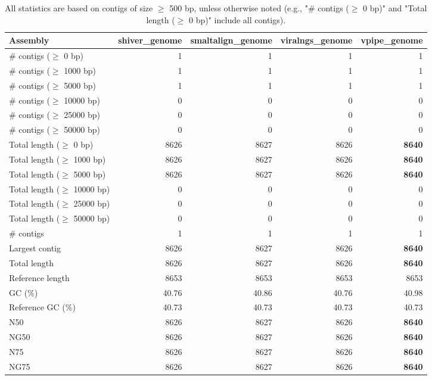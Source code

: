 \documentclass[12pt,a4paper]{article}
\begin{document}
\begin{table}[ht]
\begin{center}
\caption{All statistics are based on contigs of size $\geq$ 500 bp, unless otherwise noted (e.g., "\# contigs ($\geq$ 0 bp)" and "Total length ($\geq$ 0 bp)" include all contigs).}
\begin{tabular}{|l*{4}{|r}|}
\hline
Assembly & shiver\_genome & smaltalign\_genome & viralngs\_genome & vpipe\_genome \\ \hline
\# contigs ($\geq$ 0 bp) & 1 & 1 & 1 & 1 \\ \hline
\# contigs ($\geq$ 1000 bp) & 1 & 1 & 1 & 1 \\ \hline
\# contigs ($\geq$ 5000 bp) & 1 & 1 & 1 & 1 \\ \hline
\# contigs ($\geq$ 10000 bp) & 0 & 0 & 0 & 0 \\ \hline
\# contigs ($\geq$ 25000 bp) & 0 & 0 & 0 & 0 \\ \hline
\# contigs ($\geq$ 50000 bp) & 0 & 0 & 0 & 0 \\ \hline
Total length ($\geq$ 0 bp) & 8626 & 8627 & 8626 & {\bf 8640} \\ \hline
Total length ($\geq$ 1000 bp) & 8626 & 8627 & 8626 & {\bf 8640} \\ \hline
Total length ($\geq$ 5000 bp) & 8626 & 8627 & 8626 & {\bf 8640} \\ \hline
Total length ($\geq$ 10000 bp) & 0 & 0 & 0 & 0 \\ \hline
Total length ($\geq$ 25000 bp) & 0 & 0 & 0 & 0 \\ \hline
Total length ($\geq$ 50000 bp) & 0 & 0 & 0 & 0 \\ \hline
\# contigs & 1 & 1 & 1 & 1 \\ \hline
Largest contig & 8626 & 8627 & 8626 & {\bf 8640} \\ \hline
Total length & 8626 & 8627 & 8626 & {\bf 8640} \\ \hline
Reference length & 8653 & 8653 & 8653 & 8653 \\ \hline
GC (\%) & 40.76 & 40.86 & 40.76 & 40.98 \\ \hline
Reference GC (\%) & 40.73 & 40.73 & 40.73 & 40.73 \\ \hline
N50 & 8626 & 8627 & 8626 & {\bf 8640} \\ \hline
NG50 & 8626 & 8627 & 8626 & {\bf 8640} \\ \hline
N75 & 8626 & 8627 & 8626 & {\bf 8640} \\ \hline
NG75 & 8626 & 8627 & 8626 & {\bf 8640} \\ \hline

\end{tabular}
\end{center}
\end{table}
\end{document}
